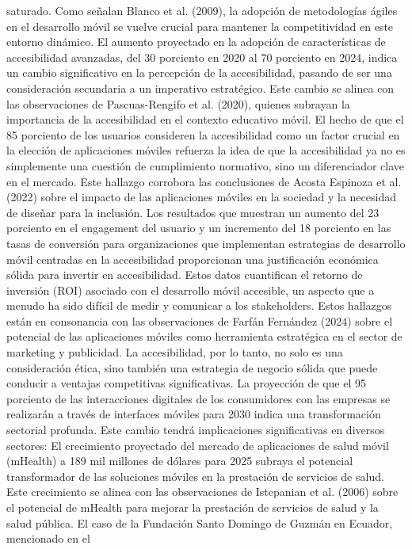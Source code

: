 \documentclass[12pt]{article}
\begin{document}
saturado. Como señalan Blanco et al. (2009), la adopción de metodologías ágiles en el desarrollo móvil se vuelve crucial para mantener la competitividad en este entorno dinámico.
El aumento proyectado en la adopción de características de accesibilidad avanzadas, del 30 porciento en 2020 al 70 porciento en 2024, indica un cambio significativo en la percepción de la accesibilidad, pasando de ser una consideración secundaria a un imperativo estratégico. Este cambio se alinea con las observaciones de Pascuas-Rengifo et al. (2020), quienes subrayan la importancia de la accesibilidad en el contexto educativo móvil.
El hecho de que el 85 porciento de los usuarios consideren la accesibilidad como un factor crucial en la elección de aplicaciones móviles refuerza la idea de que la accesibilidad ya no es simplemente una cuestión de cumplimiento normativo, sino un diferenciador clave en el mercado. Este hallazgo corrobora las conclusiones de Acosta Espinoza et al. (2022) sobre el impacto de las aplicaciones móviles en la sociedad y la necesidad de diseñar para la inclusión.
Los resultados que muestran un aumento del 23 porciento en el engagement del usuario y un incremento del 18 porciento en las tasas de conversión para organizaciones que implementan estrategias de desarrollo móvil centradas en la accesibilidad proporcionan una justificación económica sólida para invertir en accesibilidad. Estos datos cuantifican el retorno de inversión (ROI) asociado con el desarrollo móvil accesible, un aspecto que a menudo ha sido difícil de medir y comunicar a los stakeholders.
Estos hallazgos están en consonancia con las observaciones de Farfán Fernández (2024) sobre el potencial de las aplicaciones móviles como herramienta estratégica en el sector de marketing y publicidad. La accesibilidad, por lo tanto, no solo es una consideración ética, sino también una estrategia de negocio sólida que puede conducir a ventajas competitivas significativas. La proyección de que el 95 porciento de las interacciones digitales de los consumidores con las empresas se realizarán a través de interfaces móviles para 2030 indica una transformación sectorial
profunda. Este cambio tendrá implicaciones significativas en diversos sectores:
El crecimiento proyectado del mercado de aplicaciones de salud móvil (mHealth) a 189 mil millones de dólares para 2025 subraya el potencial transformador de las soluciones móviles en la prestación de servicios de salud. Este crecimiento se alinea con las observaciones de Istepanian et al. (2006) sobre el potencial de mHealth para mejorar la prestación de servicios de salud y la salud pública. El caso de la Fundación Santo Domingo de Guzmán en Ecuador, mencionado en el
 
\end{document}
